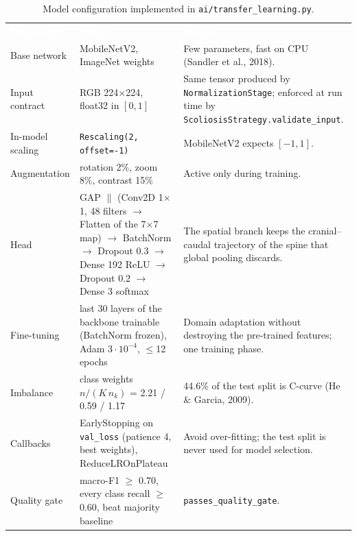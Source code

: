 \documentclass[12pt,a4paper]{article}
\newcommand{\fp}[1]{\nolinkurl{#1}}
\newcommand{\hd}[1]{\textcolor{white}{\textbf{#1}}}
\begin{document}
\begin{table}[H]
\centering
\caption{Model configuration implemented in \fp{ai/transfer_learning.py}.}
\label{tab:modelcfg}
\renewcommand{\arraystretch}{1.3}
\begin{tabularx}{\textwidth}{L{3.6cm} L{4.6cm} Y}
\hd{Parameter} & \hd{Value} & \hd{Reason} \\
Base network & MobileNetV2, ImageNet weights & Few parameters, fast on CPU (Sandler et al., 2018). \\
Input contract & RGB 224$\times$224, float32 in $[0,1]$ & Same tensor produced by \fp{NormalizationStage}; enforced at run time by \fp{ScoliosisStrategy.validate_input}. \\
In-model scaling & \texttt{Rescaling(2, offset=-1)} & MobileNetV2 expects $[-1,1]$. \\
Augmentation & rotation 2\%, zoom 8\%, contrast 15\% & Active only during training. \\
Head & GAP $\parallel$ (Conv2D 1$\times$1, 48 filters $\to$ Flatten of the 7$\times$7 map) $\to$ BatchNorm $\to$ Dropout 0.3 $\to$ Dense 192 ReLU $\to$ Dropout 0.2 $\to$ Dense 3 softmax & The spatial branch keeps the cranial--caudal trajectory of the spine that global pooling discards. \\
Fine-tuning & last 30 layers of the backbone trainable (BatchNorm frozen), Adam $3\cdot10^{-4}$, $\leq$12 epochs & Domain adaptation without destroying the pre-trained features; one training phase. \\
Imbalance & class weights $n/(K\,n_k)$ = 2.21 / 0.59 / 1.17 & 44.6\% of the test split is C-curve (He \& Garcia, 2009). \\
Callbacks & EarlyStopping on \texttt{val\_loss} (patience 4, best weights), ReduceLROnPlateau & Avoid over-fitting; the test split is never used for model selection. \\
Quality gate & macro-F1 $\geq$ 0.70, every class recall $\geq$ 0.60, beat majority baseline & \fp{passes_quality_gate}. \\
\end{tabularx}
\end{table}
\end{document}
